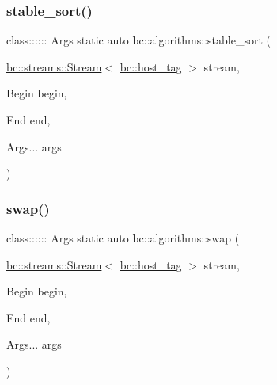 \mbox{\label{namespacebc_1_1algorithms_a3a3cce900a03fac5d37184bd7a2faf52}} 
\subsubsection{\texorpdfstring{stable\+\_\+sort()}{stable\_sort()}}
{\footnotesize\ttfamily class\+:::::: Args static auto bc\+::algorithms\+::stable\+\_\+sort (\begin{DoxyParamCaption}\item[{\hyperlink{classbc_1_1streams_1_1Stream}{bc\+::streams\+::\+Stream}$<$ \hyperlink{structbc_1_1host__tag}{bc\+::host\+\_\+tag} $>$}]{stream,  }\item[{Begin}]{begin,  }\item[{End}]{end,  }\item[{Args...}]{args }\end{DoxyParamCaption})}

\mbox{\label{namespacebc_1_1algorithms_a85e269467990595f74e2723ac77ca978}} 
\subsubsection{\texorpdfstring{swap()}{swap()}}
{\footnotesize\ttfamily class\+:::::: Args static auto bc\+::algorithms\+::swap (\begin{DoxyParamCaption}\item[{\hyperlink{classbc_1_1streams_1_1Stream}{bc\+::streams\+::\+Stream}$<$ \hyperlink{structbc_1_1host__tag}{bc\+::host\+\_\+tag} $>$}]{stream,  }\item[{Begin}]{begin,  }\item[{End}]{end,  }\item[{Args...}]{args }\end{DoxyParamCaption})}

\mbox{\label{namespacebc_1_1algorithms_aa7e4438a64dd70ccf829a31d377dd183}} 
